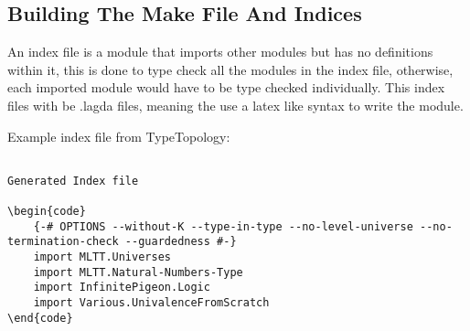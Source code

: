 
\subsection{Building The Make File And Indices} \label{sub:building make file and index }

An index file is a module that imports other modules but has no definitions
within it, this is done to type check all the modules in the index file,
otherwise, each imported module would have to be type checked individually.
This index files with be .lagda files, meaning the use a latex like syntax to
write the module.

Example index file from TypeTopology:

\begin{lstlisting}
    
Generated Index file

\begin{code}
    {-# OPTIONS --without-K --type-in-type --no-level-universe --no-termination-check --guardedness #-}
    import MLTT.Universes
    import MLTT.Natural-Numbers-Type
    import InfinitePigeon.Logic
    import Various.UnivalenceFromScratch
\end{code}
\end{lstlisting}


